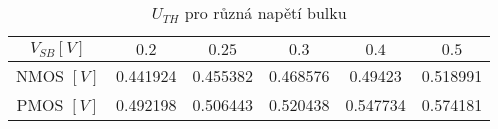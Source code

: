 \begin{table}[H]
    \centering
    \begin{tabular}{|c|c|c|c|c|c|}
        \hline
        \(V_{SB} [V]\) & \(0.2\)    & \(0.25\)  & \(0.3\)   & \(0.4\)   & \(0.5\) \\ \hline
        NMOS   \([V]\) & 0.441924   & 0.455382  & 0.468576  & 0.49423   & 0.518991 \\ \hline  
        PMOS   \([V]\) & 0.492198   & 0.506443  & 0.520438  & 0.547734  & 0.574181 \\ \hline  
    \end{tabular}
    \caption{\(U_{TH}\) pro různá napětí bulku}
    \label{tab:bulkEfekt}
\end{table}
